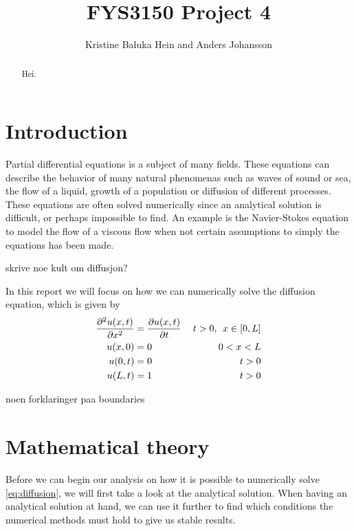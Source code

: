 \documentclass[12pt,english,a4paper]{article}
\title{FYS3150 Project 4}
\author{Kristine Baluka Hein and Anders Johansson}
\begin{document}

\pagestyle{fancy}
\tableofcontents

\begin{abstract}
Hei.
\end{abstract}
\clearpage

\section{Introduction}
Partial differential equations is a subject of many fields. These equations can describe the behavior of many natural phenomenas such as waves of sound or sea, the flow of a liquid, growth of a population or diffusion of different processes. \\
These equations are often solved numerically since an analytical solution is difficult, or perhaps impossible to find. An example is the Navier-Stokes equation to model the flow of a viscous flow when not certain assumptions to simply the equations has been made. \\ 
\begin{center}
skrive noe kult om diffusjon?
\end{center}
In this report we will focus on how we can numerically solve the diffusion equation, which is given by
\begin{equation}\label{eq:diffusion}
\begin{aligned}
\pdv[2]{u(x,t)}{x} &= \pdv{u(x,t)}{t} &\: t>0, \:\:x\in[0,L] \\
u(x,0) &= 0  &0 < x < L\\
u(0,t) &= 0 &t>0 \\
u(L,t) &= 1&t>0
\end{aligned}
\end{equation}

\begin{center}
noen forklaringer paa boundaries
\end{center}

\section{Mathematical theory}
Before we can begin our analysis on how it is possible to numerically solve \vref{eq:diffusion}, we will first take a look at the analytical solution. When having an analytical solution at hand, we can use it further to find which conditions the numerical methods must hold to give us stable results. 
\end{document}

